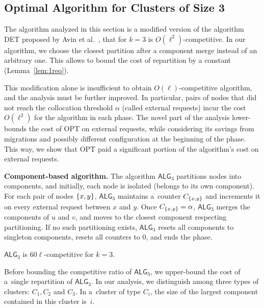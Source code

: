 \documentclass[a4paper,anonymous,USenglish]{lipics-v2019}
\newcommand{\OPT}{\textsc{OPT}\xspace}
\newcommand{\TAlg}{{\ensuremath{\textsf{ALG}_{3}}}\xspace}
\DeclarePairedDelimiter\set{\{}{\}}
\begin{document}
\subsection{Optimal Algorithm for Clusters of Size 3}
\label{sec:k3}

The algorithm analyzed in this section is a modified version of the algorithm DET proposed by Avin et al.~\cite{repartition-disc}, that for $k=3$ is $O(\ell^2)$-competitive.
In our algorithm, we choose the closest partition after a component merge instead of an arbitrary one.
This allows to bound the cost of repartition by a constant (Lemma~\ref{lem:1req}).

This modification alone is insufficient to obtain $O(\ell)$-competitive algorithm, and the analysis must be further improved.
In particular, pairs of nodes that did not reach the collocation threshold $\alpha$ (called external requests) incur the cost $O(\ell^2)$ for the algorithm in each phase.
The novel part of the analysis lower-bounds the cost of \OPT on external requests, while considering its savings from migrations and possibly different configuration at the beginning of the phase.
This way, we show that \OPT paid a significant portion of the algorithm's cost on external requests.

\medskip

\noindent
\textbf{Component-based algorithm.}
The algorithm \TAlg partitions nodes into components, and
initially, each node is isolated (belongs to its own component).
For each pair of nodes $\set{x,y}$, \TAlg maintains a~counter $C_{\set{x,y}}$ and increments it on every external request between $x$ and $y$.
Once $C_{\set{x,y}} = \alpha$, \TAlg merges the components of $u$ and $v$, and moves to the closest component respecting partitioning.
If no such partitioning exists, \TAlg resets all components to singleton components, resets all counters to $0$, and ends the phase.


\begin{theorem}
	\TAlg is $60\ell$-competitive for $k=3$.
	\label{thm:k=3}
\end{theorem}



Before bounding the competitive ratio of \TAlg, we upper-bound the cost of a~single repartition of \TAlg.
In our analysis, we distinguish among three types of clusters: $C_1, C_2$ and $C_3$. In a~cluster of type $C_i$, the size of the largest component contained in this cluster is~$i$.
\end{document}

